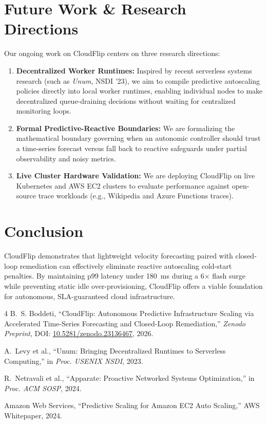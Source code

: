 \documentclass[sigconf,nonacm]{acmart}
\begin{document}
\section{Future Work & Research Directions}
Our ongoing work on CloudFlip centers on three research directions:
\begin{enumerate}
    \item \textbf{Decentralized Worker Runtimes:} Inspired by recent serverless systems research (such as \textit{Unum}, NSDI '23), we aim to compile predictive autoscaling policies directly into local worker runtimes, enabling individual nodes to make decentralized queue-draining decisions without waiting for centralized monitoring loops.
    \item \textbf{Formal Predictive-Reactive Boundaries:} We are formalizing the mathematical boundary governing when an autonomic controller should trust a time-series forecast versus fall back to reactive safeguards under partial observability and noisy metrics.
    \item \textbf{Live Cluster Hardware Validation:} We are deploying CloudFlip on live Kubernetes and AWS EC2 clusters to evaluate performance against open-source trace workloads (e.g., Wikipedia and Azure Functions traces).
\end{enumerate}

\section{Conclusion}
CloudFlip demonstrates that lightweight velocity forecasting paired with closed-loop remediation can effectively eliminate reactive autoscaling cold-start penalties. By maintaining p99 latency under 180~ms during a 6$\times$ flash surge while preventing static idle over-provisioning, CloudFlip offers a viable foundation for autonomous, SLA-guaranteed cloud infrastructure.

\begin{thebibliography}{4}
\small
{}
B.~S. Boddeti, ``CloudFlip: Autonomous Predictive Infrastructure Scaling via Accelerated Time-Series Forecasting and Closed-Loop Remediation,'' \emph{Zenodo Preprint}, DOI: \href{https://doi.org/10.5281/zenodo.23136467}{10.5281/zenodo.23136467}, 2026.

A.~Levy et al., ``Unum: Bringing Decentralized Runtimes to Serverless Computing,'' in \emph{Proc. USENIX NSDI}, 2023.

R.~Netravali et al., ``Apparate: Proactive Networked Systems Optimization,'' in \emph{Proc. ACM SOSP}, 2024.

Amazon Web Services, ``Predictive Scaling for Amazon EC2 Auto Scaling,'' AWS Whitepaper, 2024.
\end{thebibliography}
\end{document}
